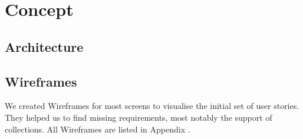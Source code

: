 \chapter{Concept} %

\section{Architecture}

\section{Wireframes}

We created Wireframes for most screens to visualise the initial set of user stories.
They helped us to find missing requirements, most notably the support of collections.
All Wireframes are listed in Appendix .